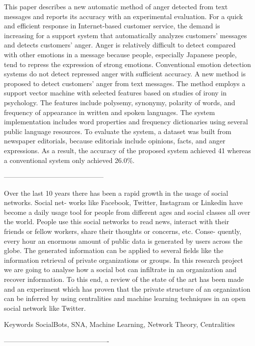 This paper describes a new automatic method of anger detected from text messages
and reports its accuracy with an experimental evaluation.
For a quick and efficient response in Internet-based customer service, the demand is
increasing for a support system that automatically analyzes customers' messages and
detects customers' anger. Anger is relatively difficult to detect compared with other
emotions in a message because people, especially Japanese people, tend to repress the
expression of strong emotions. Conventional emotion detection systems do not detect
repressed anger with sufficient accuracy.
A new method is proposed to detect customers' anger from text messages. The method
employs a support vector machine with selected features based on studies of irony in
psychology. The features include polysemy, synonymy, polarity of words, and frequency of
appearance in written and spoken languages. The system implementation includes word
properties and frequency dictionaries using several public language resources.
To evaluate the system, a dataset was built from newspaper editorials, because editorials include
opinions, facts, and anger expressions. As a result, the accuracy of the proposed system achieved 41%
whereas a conventional system only achieved 26.0\%.

--------------------------------------------

Over the last 10 years there has been a rapid growth in the usage of social networks. Social net- works like Facebook, Twitter, Instagram or Linkedin have become a daily usage tool for people from different ages and social classes all over the world. People use this social networks to read news, interact with their friends or fellow workers, share their thoughts or concerns, etc. Conse- quently, every hour an enormous amount of public data is generated by users across the globe. The generated information can be applied to several fields like the information retrieval of private organizations or groups. In this research project we are going to analyse how a social bot can infiltrate in an organization and recover information. To this end, a review of the state of the art has been made and an experiment which has proven that the private structure of an organization can be inferred by using centralities and machine learning techniques in an open social network like Twitter.

Keywords
SocialBots, SNA, Machine Learning, Network Theory, Centralities

----------------------------------------------


